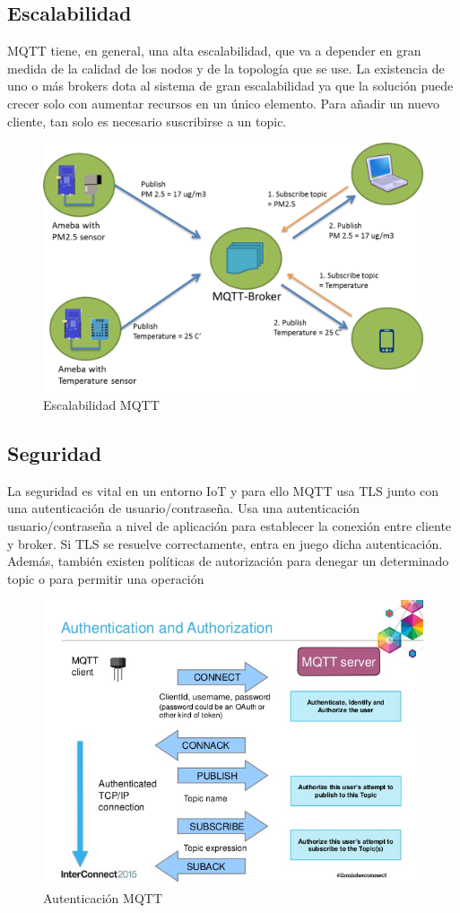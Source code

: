 \documentclass[12pt, twoside]{book}
\begin{document}
\subsection{Escalabilidad}
MQTT tiene, en general, una alta escalabilidad, que va a depender en gran medida de la calidad de los nodos y de la topología que se use. La existencia de uno o más brokers dota al sistema de gran escalabilidad ya que la solución puede crecer solo con aumentar recursos en un único elemento.
Para añadir un nuevo cliente, tan solo es necesario suscribirse a un topic.
\begin{figure}[h!]
\centering
\includegraphics[scale=0.3]{images/figure3.png}
\caption{Escalabilidad MQTT}\label{L403}
\end{figure}
\subsection{Seguridad}
La seguridad es vital en un entorno IoT y para ello MQTT usa TLS junto con una autenticación de usuario/contraseña. Usa una autenticación usuario/contraseña a nivel de aplicación para establecer la conexión entre cliente y broker. Si TLS se resuelve correctamente, entra en juego dicha autenticación. Además, también existen políticas de autorización para denegar un determinado topic o para permitir una operación
\begin{figure}[h!]
\centering
\includegraphics[scale=0.3]{images/mqtt_ssl}
\caption{Autenticación MQTT}\label{L404}
\end{figure}
\end{document}

